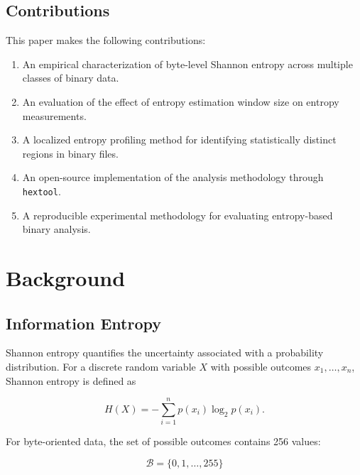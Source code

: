 \documentclass[10pt,letterpaper]{article}
\begin{document}
\subsection{Contributions}

This paper makes the following contributions:
\begin{enumerate}
    \item 
    An empirical characterization of byte-level Shannon entropy across multiple classes of binary data.

    \item
    An evaluation of the effect of entropy estimation window size on entropy measurements.

    \item 
    A localized entropy profiling method for identifying statistically distinct regions in binary files. 
    
    \item 
    An open-source implementation of the analysis methodology through \texttt{hextool}. 
    
    \item A reproducible experimental methodology for evaluating entropy-based binary analysis.
\end{enumerate}


\section{Background}

\subsection{Information Entropy}

Shannon entropy quantifies the uncertainty associated with a probability distribution.
For a discrete random variable $X$ with possible outcomes $x_1, \dots, x_n$, Shannon entropy is defined as

\begin{equation}
    H(X)
    =
    -\sum_{i=1}^{n}
    p(x_i)\log_2 p(x_i).
\end{equation}

For byte-oriented data, the set of possible outcomes contains 256 values:

\begin{equation}
    \mathcal{B}
    =
    \{0,1,\ldots,255\}
\end{equation}
\end{document}
